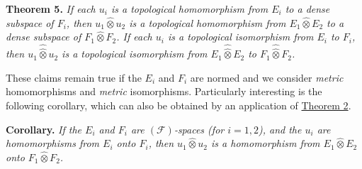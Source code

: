 \documentclass[british]{article}
\newenvironment{itenv}[1]
  {\phantomsection\par\smallskip\noindent\textbf{#1.}\itshape}
  {\par\smallskip}
\newcommand{\oldpage}[1]{\marginpar{\footnotesize$\Big\vert$ \textit{p.~#1}}}
\begin{document}
\protect{}\label{section-1-theorem-5}
\begin{itenv}{Theorem 5}
If each \(u_i\) is a topological homomorphism from \(E_i\) to a dense
subspace of \(F_i\), then \(u_1\hat{\otimes}u_2\) is a topological
homomorphism from \(E_1\hat{\otimes}E_2\) to a dense subspace of
\(F_1\hat{\otimes}F_2\). If each \(u_i\) is a topological isomorphism
from \(E_i\) to \(F_i\), then \(u_1\hat{\hat{\otimes}}u_2\) is a
topological isomorphism from \(E_1\hat{\hat{\otimes}}E_2\) to
\(F_1\hat{\hat{\otimes}}F_2\).

\end{itenv}

These claims remain true if the \(E_i\) and \(F_i\) are normed and we
consider \emph{metric} homomorphisms and \emph{metric} isomorphisms.
Particularly interesting is the following corollary, which can also be
obtained by an application of \hyperref[section-1-theorem-2]{Theorem 2}.

\begin{itenv}{Corollary}
If the \(E_i\) and \(F_i\) are \((\mathscr{F})\)-spaces (for \(i=1,2\)),
and the \(u_i\) are homomorphisms from \(E_i\) \emph{onto} \(F_i\), then
\(u_1\hat{\otimes}u_2\) is a homomorphism from \(E_1\hat{\otimes}E_2\)
\emph{onto} \(F_1\hat{\otimes}F_2\).

\end{itenv}

\oldpage{84}
\end{document}
